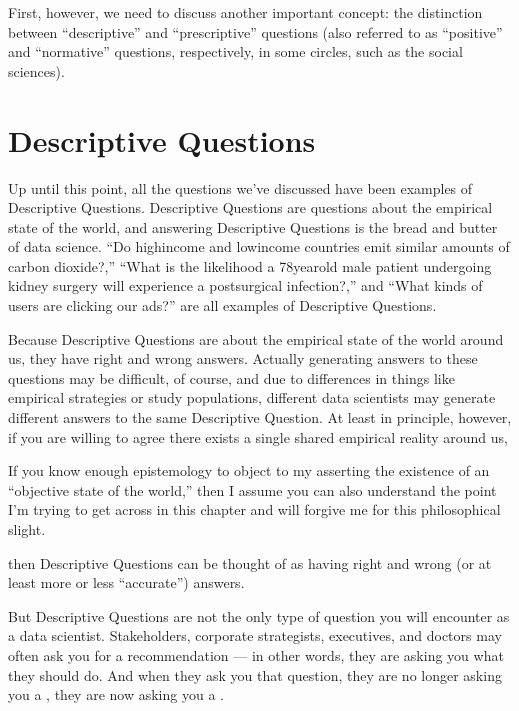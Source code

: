 \documentclass[letterpaper,10pt,english]{jupyterBook}
\begin{document}
\sphinxAtStartPar
First, however, we need to discuss another important concept: the distinction between “descriptive” and “prescriptive” questions (also referred to as “positive” and “normative” questions, respectively, in some circles, such as the social sciences).


\section{Descriptive Questions}
\label{\detokenize{30_questions/05_descriptive_v_prescriptive:descriptive-questions}}
\sphinxAtStartPar
Up until this point, all the questions we’ve discussed have been examples of Descriptive Questions. Descriptive Questions are questions about the empirical state of the world, and answering Descriptive Questions is the bread and butter of data science. “Do high\sphinxhyphen{}income and low\sphinxhyphen{}income countries emit similar amounts of carbon dioxide?,” “What is the likelihood a 78\sphinxhyphen{}year\sphinxhyphen{}old male patient undergoing kidney surgery will experience a post\sphinxhyphen{}surgical infection?,” and “What kinds of users are clicking our ads?” are all examples of Descriptive Questions.

\sphinxAtStartPar
Because Descriptive Questions are about the empirical state of the world around us, they have right and wrong answers. Actually generating answers to these questions may be difficult, of course, and due to differences in things like empirical strategies or study populations, different data scientists may generate different answers to the same Descriptive Question. At least in principle, however, if you are willing to agree there exists a single shared empirical reality around us,%
\begin{footnote}[1]\sphinxAtStartFootnote
If you know enough epistemology to object to my asserting the existence of an “objective state of the world,” then I assume you can also understand the point I’m trying to get across in this chapter and will forgive me for this philosophical slight.
%
\end{footnote} then Descriptive Questions can be thought of as having right and wrong (or at least more or less “accurate”) answers.

\sphinxAtStartPar
But Descriptive Questions are not the only type of question you will encounter as a data scientist. Stakeholders, corporate strategists, executives, and doctors may often ask you for a recommendation — in other words, they are asking you what they should do. And when they ask you that question, they are no longer asking you a , they are now asking you a .
\end{document}

